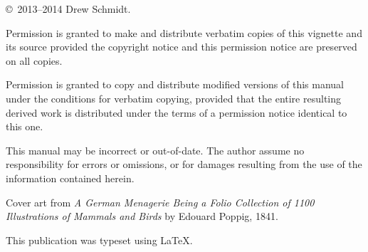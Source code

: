 \null
\vfill
\copyright\ 2013--2014 Drew Schmidt.

Permission is granted to make and distribute verbatim copies of
this vignette and its source provided the copyright notice and
this permission notice are preserved on all copies.

Permission is granted to copy and distribute modified versions of this manual under the conditions for verbatim copying, provided that the entire resulting derived work is distributed under the terms of a permission notice identical to this one. 

This manual may be incorrect or out-of-date.  The author assume
no responsibility for errors or omissions, or for damages resulting
from the use of the information contained herein.

Cover art from \emph{A German Menagerie Being a Folio Collection of 1100 Illustrations of Mammals and Birds} by Edouard Poppig, 1841.

This publication was typeset using \LaTeX.

